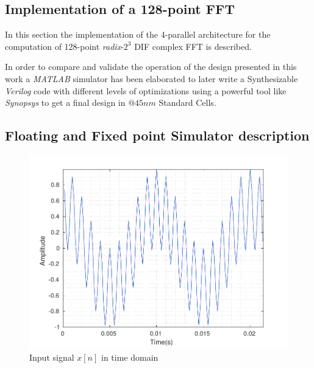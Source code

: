 \documentclass[journal,comsoc]{IEEEtran}
\begin{document}
 
\subsection{Implementation of a 128-point FFT}
In this section the implementation of the 4-parallel architecture for the computation of 128-point \textit{radix}-$2^3$ DIF complex FFT is described.



In order to compare and validate the operation of the design presented in this work a \textit{MATLAB} simulator has been elaborated to later write  a Synthesizable \textit{Verilog} code with different levels of optimizations using a powerful tool like \textit{Synopsys} to get a final design in $@45nm$ Standard Cells.

\subsection{Floating and Fixed point Simulator description}


\begin{figure}[ht!] 
	\centering
	\includegraphics[width=0.92\linewidth]{Diagramas/DftInputSignal.pdf}
	\caption{Input signal $x[n]$ in time domain}
	\label{fig:dftinputsignal}
\end{figure}
\end{document}
